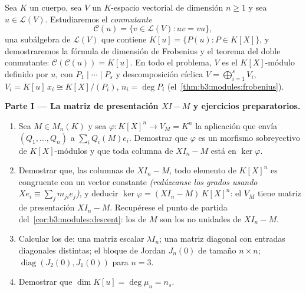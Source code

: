 \begin{problem}\label{pb:b3:modules:1} Sea $K$ un cuerpo, sea $V$ un
$K$-espacio vectorial de dimensión $n \geq
1$ y sea $u \in \mathcal L(V)$. Estudiaremos el \emph{conmutante}
\[
\mathcal C(u) = \{v \in \mathcal L(V) : uv = vu\},
\]
una subálgebra de $\mathcal L(V)$ que contiene $K[u] = \{P(u) : P \in
K[X]\}$, y demostraremos la fórmula de dimensión de Frobenius y el
teorema del doble conmutante: $\mathcal C(\mathcal C(u)) = K[u]$. En
todo el problema, $V$ es el $K[X]$-módulo definido por $u$, con
$P_1 \mid \cdots \mid P_s$ y descomposición cíclica $V =
\bigoplus_{i=1}^s V_i$, $V_i = K[u]\,x_i \cong K[X]/(P_i)$, $n_i
= \deg P_i$ (el~\cref{thm:b3:modules:frobenius}).

\medskip
\noindent\textbf{Parte I --- La matriz de presentación $XI - M$ y
ejercicios preparatorios.}
\begin{enumerate}
  \item Sea $M \in M_n(K)$ y sea $\varphi \colon K[X]^n \to V_M
        = K^n$ la aplicación que envía $(Q_1, \dots, Q_n)$ a
  $\sum_i Q_i(M)e_i$. Demostrar que $\varphi$ es un morfismo
  sobreyectivo de $K[X]$-módulos y que toda columna de $XI_n - M$ está
  en $\ker\varphi$. \item Demostrar que,  las columnas de
  $XI_n - M$, todo elemento de $K[X]^n$ es congruente con un vector
  constante \emph{(redúzcanse los grados usando
  $Xe_i \equiv \sum_j m_{ji}e_j$)}, y deducir
  $\ker\varphi = (XI_n - M)\,K[X]^n$: el
   $V_M$ tiene matriz de
  presentación $XI_n - M$. Recupérese el punto de partida
  del~\cref{cor:b3:modules:descent}: los
   de $M$ son
  los  no unidades de
  $XI_n - M$. \item Calcular los
   de: una
  matriz escalar $\lambda I_n$; una matriz diagonal con entradas
  diagonales distintas; el bloque de Jordan $J_n(0)$ de tamaño
  $n \times n$; $\operatorname{diag}(J_2(0), J_1(0))$ para $n = 3$.
  \item Demostrar que $\dim K[u] = \deg \mu_u = n_s$.
\end{enumerate}


\end{problem}
